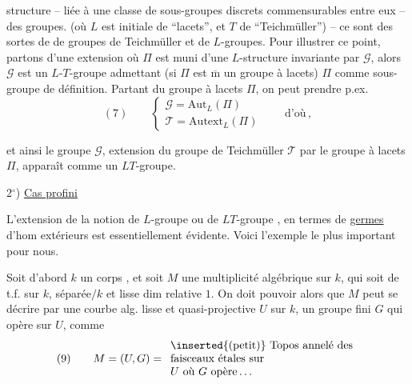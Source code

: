 
structure -- liée à une classe de sous-groupes discrets commensurables entre eux -- des groupes. (où $L$ est initiale de ``lacets'', et $T$ de ``Teichmüller'') -- ce sont des sortes de  de groupes de Teichmüller et de $L$-groupes. Pour illustrer ce point, partons d'une extension
où $\Pi$ est muni d'une $L$-structure invariante par $\mathcal{G}$, alors $\mathcal{G}$ est un $L$-$T$-groupe admettant (si $\Pi$ est $\overline{\mathrm m}$ un groupe à lacets) $\Pi$ comme sous-groupe de définition. Partant du groupe à lacets $\Pi$, on peut prendre p.ex.
\[
(7)\qquad
\left\{
\begin{array}{l}
\mathcal{G}=\mathrm{Aut}_{L}(\Pi)\\
\mathcal{T}=\mathrm{Autext}_{L}(\Pi)
\end{array}
\right.
\qquad\text{d'où}
\,,
\]


et ainsi le groupe  $\mathcal{G}$, extension du groupe de Teichmüller $\mathcal{T}$ par le groupe à lacets $\Pi$, apparaît comme un $LT$-groupe.



2$^\circ$) \uline{Cas profini}

L'extension de la notion de $L$-groupe ou de $LT$-groupe \inserted{$\Pi$}, en termes de \uline{germes} d'hom extérieurs
est essentiellement évidente. Voici l'exemple le plus important pour nous. 

Soit d'abord $k$ un corps , et soit $M$ une   multiplicité algébrique sur $k$, qui soit  de t.f. sur $k$,  séparée$/k$ et lisse  dim relative $1$. On doit pouvoir  alors que $M$ peut se décrire par une courbe alg. lisse et quasi-projective $U$ sur $k$, un groupe fini  $G$ qui opère sur $U$,  comme
\[
(9)\qquad M=(U,G)=
\begin{array}{l}
\inserted{\text{(petit)}}\text{ Topos annelé des}\\
\text{faisceaux étales sur}\\
U\text{ où }G\text{ opère}\ldots
\end{array}
\]


